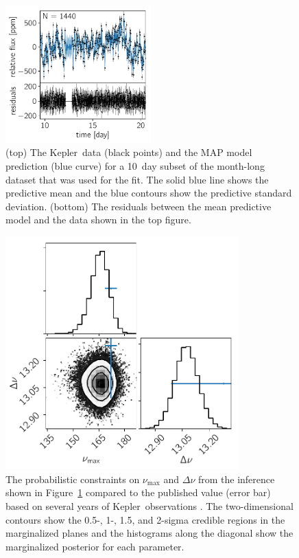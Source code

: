 \documentclass[manuscript, letterpaper]{aastex6}
\newcommand{\project}[1]{\textsf{#1}}
\newcommand{\kepler}{\project{Kepler}}
\newcommand{\figureref}[1]{\ref{fig:#1}}
\newcommand{\Figure}[1]{Figure~\figureref{#1}}
\newcommand{\figurelabel}[1]{\label{fig:#1}}
\newcommand{\response}[1]{{\color{blue}#1}}
\begin{document}


\begin{figure}[!htbp]
\begin{center}
\includegraphics[width=0.5\textwidth]{figures/astero/astero.pdf}
\caption{
\response{
(top) The \kepler\ data (black points) and the MAP model
    prediction (blue curve) for a 10~day subset of the month-long dataset that
    was used for the fit.
    The solid blue line shows the predictive mean and the blue contours show
    the predictive standard deviation.
(bottom) The residuals between the mean predictive model and the data
    shown in the top figure.
}
    \figurelabel{astero}}
\end{center}
\end{figure}

\begin{figure}[!p]
\begin{center}
\includegraphics[width=0.8\textwidth]{figures/astero/astero-corner.pdf}
\caption{The probabilistic constraints on $\nu_\mathrm{max}$ and $\Delta \nu$
    from the inference shown in \Figure{astero} compared to the published
    value (error bar) based on several years of \kepler\ observations
    \citep{Pinsonneault:2014}.
    The two-dimensional contours show the 0.5-, 1-, 1.5, and 2-sigma credible
    regions in the marginalized planes and the histograms along the diagonal
    show the marginalized posterior for each parameter.
    \figurelabel{astero-corner}}
\end{center}
\end{figure}
\end{document}
